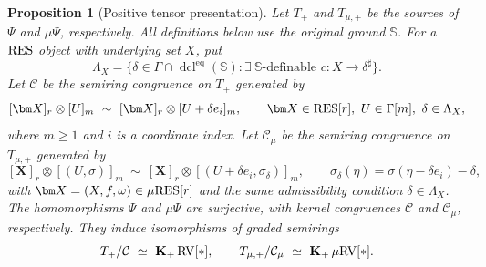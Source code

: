 \documentclass[12pt]{amsart}
\theoremstyle{plain}
\newtheorem{prop}[thm]{Proposition}
\theoremstyle{definition}
\theoremstyle{remark}
\numberwithin{equation}{section}
\theoremstyle{plain}
\newcommand{\RV}{\textup{RV}}
\DeclareMathOperator{\dcl}{dcl}
\newcommand{\0}{\emptyset}
\newcommand{\mgRV}{{\mu}{\RV}}
\newcommand{\RES}{\textup{RES}}
\newcommand{\mgRES}{{\mu}{\RES}}
\DeclareMathOperator{\gsk}{\mathbf{K}_+}
\begin{document}
\begin{prop}[Positive tensor presentation]\label{red:D:iso}
Let $T_+$ and $T_{\mu,+}$ be the sources of $\Psi$ and ${\mu}\Psi$,
respectively. All definitions below use the original ground $\mathbb S$.
For a $\RES$ object with underlying set $X$, put
\[
 \Lambda_X=\{\delta\in\Gamma\cap\dcl^{\mathrm{eq}}(\mathbb S):
         \exists\ \mathbb S\text{-definable }c:X\to\delta^\sharp\}.
\]
Let $\mathcal C$ be the semiring congruence on $T_+$ generated by
\[
 [\bm X]_r\otimes[U]_m\ \sim\
 [\bm X]_r\otimes[U+\delta e_i]_m,
 \qquad \bm X\in\RES[r],\ U\in\Gamma[m],\ \delta\in\Lambda_X,
\]
where $m\geq1$ and $i$ is a coordinate index. Let $\mathcal C_\mu$
be the semiring congruence on $T_{\mu,+}$ generated by
\[
 [\bm X]_r\otimes[(U,\sigma)]_m\ \sim\
 [\bm X]_r\otimes[(U+\delta e_i,\sigma_\delta)]_m,
 \qquad \sigma_\delta(\eta)=\sigma(\eta-\delta e_i)-\delta,
\]
with $\bm X=(X,f,\omega)\in\mgRES[r]$ and the same admissibility
condition $\delta\in\Lambda_X$.
The homomorphisms $\Psi$ and ${\mu}\Psi$ are surjective, with kernel
congruences $\mathcal C$ and $\mathcal C_\mu$, respectively. They induce
isomorphisms of graded semirings
\[
 T_+/\mathcal C\ \simeq\ \gsk\RV[*],\qquad
 T_{\mu,+}/\mathcal C_\mu\ \simeq\ \gsk\mgRV[*].
\]
\end{prop}
\end{document}

